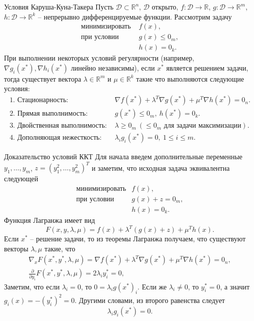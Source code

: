 \documentclass[10pt]{beamer}
\begin{document}
\begin{frame}{Условия Каруша-Куна-Такера}
Пусть $\mathcal{D}\subset \mathbb{R}^n$, $\mathcal{D}$ открыто, $f:\mathcal{D}\rightarrow \mathbb{R}$, $g:\mathcal{D}\rightarrow \mathbb{R}^m$, $h:\mathcal{D}\rightarrow \mathbb{R}^k$ -- непрерывно дифференцируемые функции. Рассмотрим задачу
$$
\begin{array}{ll}
\mbox{минимизировать } & f(x),\\
\mbox{при условии }    & g(x)\leq 0_m,\\
					   & h(x)=0_k.
\end{array}
$$
При выполнении некоторых условий регулярности (например, $\nabla g_i(x^*), \nabla h_i(x^*)$ линейно независимы), если $x^*$ является решением задачи, тогда существует вектора $\lambda\in\mathbb{R}^m$ и $\mu\in\mathbb{R}^k$ такие что выполняются следующие условия:
$$
\begin{array}{ll}
\mbox{1. Стационарность: }& \nabla f(x^*) + \lambda^T\nabla g(x^*)+\mu^T \nabla h(x^*)=0_n.\\
\mbox{2. Прямая выполнимость: }&g(x^*)\leq 0_m,~h(x^*)=0_k.\\
\mbox{3. Двойственная выполнимость: }&\lambda\geq 0_m~(\leq 0_m \mbox{ для задачи максимизации}).\\
\mbox{4. Дополняющая нежесткость: }& \lambda_i g_i(x^*)=0,~1\leq i\leq m.
\end{array}
$$
\end{frame}

\begin{frame}{Доказательство условий ККТ}
Для начала введем дополнительные переменные $y_1, \ldots, y_m$, $z=(y^2_1,\ldots, y^2_m)^T$ и заметим, что исходная задача эквивалентна следующей
$$
\begin{array}{ll}
\mbox{минимизировать} & f(x), \\
\mbox{при условии} & g(x)+z= 0_m, \\
 & h(x)=0_k.
\end{array}
$$
Функция Лагранжа имеет вид
$$
F(x, y, \lambda, \mu) = f(x) + \lambda^T(g(x)+z)+\mu^Th(x).
$$
Если $x^*$ -- решение задачи, то из теоремы Лагранжа получаем, что существуют векторы $\lambda, \mu$ такие, что
\begin{align*}
\nabla_x F(x^*, y^*,\lambda, \mu)= \nabla f (x^*) + \lambda^T\nabla g (x^*) + \mu^T \nabla h(x^*)=0_n, \\
\frac{\partial}{\partial y_i} F(x^*, y^*,\lambda, \mu) = 2\lambda_i y^*_i = 0, 
\end{align*}
Заметим, что если $\lambda_i=0$, то $0=\lambda_i g(x^*)_i$. Если же $\lambda_i\neq 0$, то $y^*_i=0$, а значит $g_i(x)=-(y^*_i)^2=0$. Другими словами, из второго равенства следует 
$$
\lambda_ig_i(x^*)=0.
$$
\end{frame}
\end{document}
